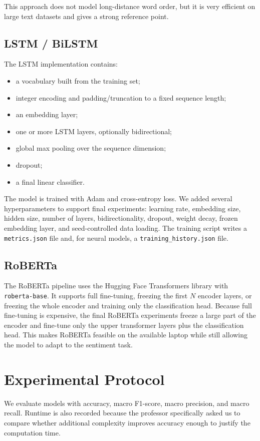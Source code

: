 \documentclass[conference]{IEEEtran}
\begin{document}
This approach does not model long-distance word order, but it is very efficient
on large text datasets and gives a strong reference point.

\subsection{LSTM / BiLSTM}
The LSTM implementation contains:
\begin{itemize}
  \item a vocabulary built from the training set;
  \item integer encoding and padding/truncation to a fixed sequence length;
  \item an embedding layer;
  \item one or more LSTM layers, optionally bidirectional;
  \item global max pooling over the sequence dimension;
  \item dropout;
  \item a final linear classifier.
\end{itemize}

The model is trained with Adam and cross-entropy loss. We added several
hyperparameters to support final experiments: learning rate, embedding size,
hidden size, number of layers, bidirectionality, dropout, weight decay, frozen
embedding layer, and seed-controlled data loading. The training script writes a
\texttt{metrics.json} file and, for neural models, a
\texttt{training\_history.json} file.

\subsection{RoBERTa}
The RoBERTa pipeline uses the Hugging Face Transformers library with
\texttt{roberta-base}. It supports full fine-tuning, freezing the first $N$
encoder layers, or freezing the whole encoder and training only the
classification head. Because full fine-tuning is expensive, the final RoBERTa
experiments freeze a large part of the encoder and fine-tune only the upper
transformer layers plus the classification head. This makes RoBERTa feasible on
the available laptop while still allowing the model to adapt to the sentiment
task.

\section{Experimental Protocol}
We evaluate models with accuracy, macro F1-score, macro precision, and macro
recall. Runtime is also recorded because the professor specifically asked us to
compare whether additional complexity improves accuracy enough to justify the
computation time.
\end{document}
